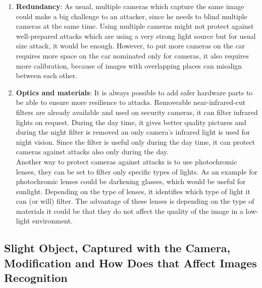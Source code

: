 \begin{enumerate}
	\item \textbf{Redundancy}: As usual, multiple cameras which capture the same image could make a big challenge to an attacker, since he needs to blind multiple cameras at the same time. Using multiple cameras might not protect against well-prepared attacks which are using a very strong light source but for usual size attack, it would be enough. However, to put more cameras on the car requires more space on the car nominated only for cameras, it also requires more calibration, because of images with overlapping places can misalign between each other.
	\item \textbf{ Optics and materials}: It is always possible to add safer hardware parts to be able to ensure more resilience to attacks. Removeable near-infrared-cut filters are already available and used on security cameras, it can filter infrared
	lights on request. During the day time, it gives better quality pictures and during the night filter is removed an only camera's infrared light is used for night vision. Since the filter is useful only during the day time, it can protect cameras against attacks also only during the day. \\
	Another way to protect cameras against attacks is to use photochromic lenses, they can be set to filter only specific types of lights. As an example for photochromic lenses could be darkening glasses, which would be useful for sunlight. Depending on the type of lenses, it identifies which type of light it can (or will) filter. The advantage of these lenses is depending on the type of materials it could be that they do not affect the quality of the image in a low-light environment.
\end{enumerate}

\subsection{Slight Object, Captured with the Camera, Modification and How Does that Affect Images Recognition}

